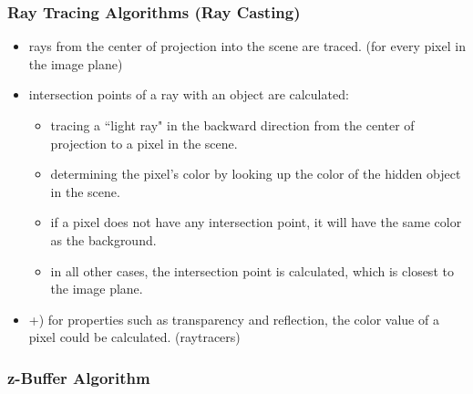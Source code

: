 \documentclass{standalone}
\begin{document}
\subsubsection*{Ray Tracing Algorithms (Ray Casting)}

\begin{itemize}
	\item rays from the center of projection into the scene are traced. (for every pixel in the image plane)
	\item intersection points of a ray with an object are calculated:
		\begin{itemize}
			\item tracing a ``light ray" in the backward direction from the center of projection to a pixel in the scene.
			\item determining the pixel's color by looking up the color of the hidden object in the scene.
			\item if a pixel does not have any intersection point, it will have the same color as the background.
			\item in all other cases, the intersection point is calculated, which is closest to the image plane.
		\end{itemize}
	\item +) for properties such as transparency and reflection, the color value of a pixel could be calculated. (raytracers)
\end{itemize}


\subsubsection*{z-Buffer Algorithm}
\end{document}

